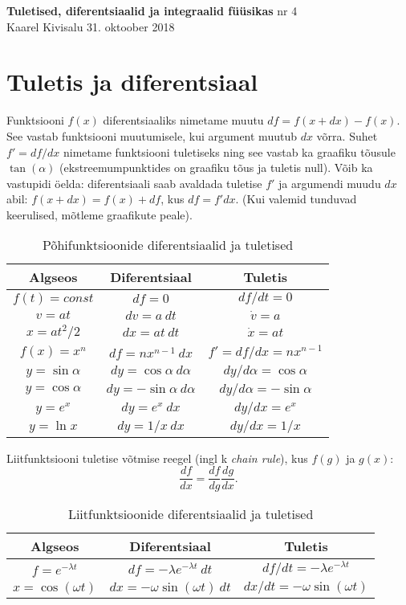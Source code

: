 \documentclass[a4paper,11pt,twocolumn]{article}
\begin{document}
{\huge \textbf{Tuletised, diferentsiaalid ja integraalid füüsikas} \hfill \normalsize {nr 4}} \\
{Kaarel Kivisalu \hfill 31. oktoober 2018}

\section{Tuletis ja diferentsiaal}
Funktsiooni \( f(x) \) diferentsiaaliks nimetame muutu \( df = f(x + dx) − f(x) \). See vastab funktsiooni muutumisele, kui argument muutub \( dx \) võrra. Suhet \( f' = df /dx \) nimetame funktsiooni tuletiseks ning see vastab ka graafiku tõusule \( \tan(\alpha) \) (ekstreemumpunktides on graafiku tõus ja tuletis null). Võib ka vastupidi öelda: diferentsiaali saab avaldada tuletise \( f' \) ja argumendi muudu \( dx \) abil: \( f(x + dx) = f(x) + df \), kus \( df = f'dx \). (Kui valemid tunduvad keerulised, mõtleme graafikute peale).

\begin{table}[h]
	\centering
	\caption{Põhifunktsioonide diferentsiaalid ja tuletised}
	\begin{tabular}{ c | c | c }
		\hline \hline
		Algseos & Diferentsiaal & Tuletis \\ 
		\hline
		\( f(t)=const \) & \( df=0 \) & \( df/dt=0 \) \\  
		\( v=at \) & \( dv=a\ dt \) & \( \dot{v}=a \) \\
		\( x=at^2/2 \) & \( dx=at\ dt \) & \( \dot{x}=at \) \\
		\( f(x)=x^n \) & \( df=nx^{n-1}\ dx \) & \( f'=df/dx=nx^{n-1} \) \\
		\( y=\sin \alpha \) & \( dy=\cos \alpha\ d\alpha \) & \( dy/d\alpha=\cos \alpha \) \\  
		\( y=\cos \alpha \) & \( dy=-\sin \alpha\ d\alpha \) & \( dy/d\alpha=-\sin \alpha  \) \\
		\( y=e^x \) & \( dy=e^x\ dx \) & \( dy/dx=e^x \) \\ 
		\( y=\ln x \) & \( dy=1/x\ dx \) & \( dy/dx=1/x \) \\ 
	\end{tabular}
\end{table}

Liitfunktsiooni tuletise võtmise reegel (ingl k \textit{chain rule}), kus \( f(g) \) ja \( g(x) \):
\[ \frac{df}{dx}=\frac{df}{dg}\frac{dg}{dx} \textrm{.}\]

\begin{table}[h!]
	\centering
	\caption{Liitfunktsioonide diferentsiaalid ja tuletised}
	\begin{tabular}{ c | c | c }
		\hline \hline
		Algseos & Diferentsiaal & Tuletis \\ 
		\hline
		\( f=e^{-\lambda t} \) & \( df=-\lambda e^{-\lambda t}\ dt \) & \( df/dt=-\lambda e^{-\lambda t} \) \\  
		\( x=\cos (\omega t) \) & \( dx=-\omega\sin (\omega t)\ dt\) & \( dx/dt=-\omega\sin (\omega t) \) \\
	\end{tabular}
\end{table}
\end{document}
